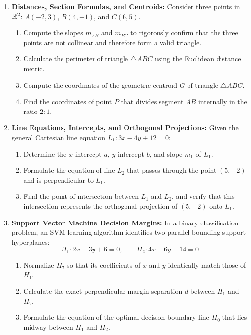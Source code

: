 \begin{enumerate}
    \item \textbf{Distances, Section Formulas, and Centroids:} Consider three points in $\mathbb{R}^2$: $A(-2, 3)$, $B(4, -1)$, and $C(6, 5)$.
    \begin{enumerate}
        \item Compute the slopes $m_{AB}$ and $m_{BC}$ to rigorously confirm that the three points are not collinear and therefore form a valid triangle.
        \item Calculate the perimeter of triangle $\triangle ABC$ using the Euclidean distance metric.
        \item Compute the coordinates of the geometric centroid $G$ of triangle $\triangle ABC$.
        \item Find the coordinates of point $P$ that divides segment $AB$ internally in the ratio $2 : 1$.
    \end{enumerate}

    \item \textbf{Line Equations, Intercepts, and Orthogonal Projections:} Given the general Cartesian line equation $L_1: 3x - 4y + 12 = 0$:
    \begin{enumerate}
        \item Determine the $x$-intercept $a$, $y$-intercept $b$, and slope $m_1$ of $L_1$.
        \item Formulate the equation of line $L_2$ that passes through the point $(5, -2)$ and is perpendicular to $L_1$.
        \item Find the point of intersection between $L_1$ and $L_2$, and verify that this intersection represents the orthogonal projection of $(5, -2)$ onto $L_1$.
    \end{enumerate}

    \item \textbf{Support Vector Machine Decision Margins:} In a binary classification problem, an SVM learning algorithm identifies two parallel bounding support hyperplanes:
    $$H_1: 2x - 3y + 6 = 0, \qquad H_2: 4x - 6y - 14 = 0$$
    \begin{enumerate}
        \item Normalize $H_2$ so that its coefficients of $x$ and $y$ identically match those of $H_1$.
        \item Calculate the exact perpendicular margin separation $d$ between $H_1$ and $H_2$.
        \item Formulate the equation of the optimal decision boundary line $H_0$ that lies midway between $H_1$ and $H_2$.
    \end{enumerate}


\end{enumerate}
